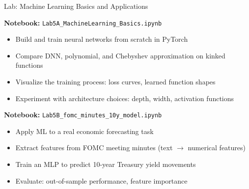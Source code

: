 \documentclass[10pt,english,aspectratio=169]{beamer}
\begin{document}
\begin{frame}{Lab: Machine Learning Basics and Applications}

\begin{tcolorbox}[colback=green!3, colframe=green!40, title=Lab 5A: Machine Learning Basics]
\textbf{Notebook:} \texttt{Lab5A\_MachineLearning\_Basics.ipynb}
\begin{itemize}
\item Build and train neural networks from scratch in PyTorch
\item Compare DNN, polynomial, and Chebyshev approximation on kinked functions
\item Visualize the training process: loss curves, learned function shapes
\item Experiment with architecture choices: depth, width, activation functions
\end{itemize}
\end{tcolorbox}

\medskip

\begin{tcolorbox}[colback=blue!3, colframe=blue!40, title=Lab 5B: FOMC Minutes and 10-Year Yield Model]
\textbf{Notebook:} \texttt{Lab5B\_fomc\_minutes\_10y\_model.ipynb}
\begin{itemize}
\item Apply ML to a real economic forecasting task
\item Extract features from FOMC meeting minutes (text $\to$ numerical features)
\item Train an MLP to predict 10-year Treasury yield movements
\item Evaluate: out-of-sample performance, feature importance
\end{itemize}
\end{tcolorbox}
\end{frame}

\end{document}
